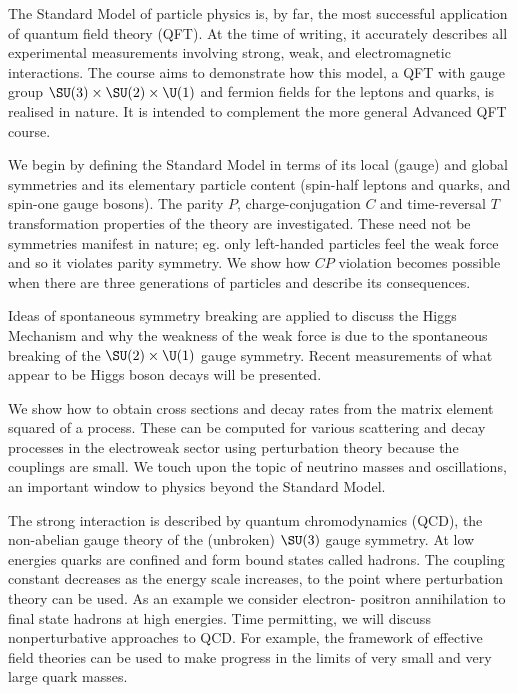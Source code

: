 \documentclass[a4paper]{article}
\begin{document}
\maketitle
{\small
\setlength{\parindent}{0em}
\setlength{\parskip}{1em}
The Standard Model of particle physics is, by far, the most successful application of quantum field theory (QFT). At the time of writing, it accurately describes all experimental measurements involving strong, weak, and electromagnetic interactions. The course aims to demonstrate how this model, a QFT with gauge group $\SU(3) \times \SU(2) \times \U(1)$ and fermion fields for the leptons and quarks, is realised in nature. It is intended to complement the more general Advanced QFT course.

We begin by defining the Standard Model in terms of its local (gauge) and global symmetries and its elementary particle content (spin-half leptons and quarks, and spin-one gauge bosons). The parity $P$, charge-conjugation $C$ and time-reversal $T$ transformation properties of the theory are investigated. These need not be symmetries manifest in nature; eg. only left-handed particles feel the weak force and so it violates parity symmetry. We show how $CP$ violation becomes possible when there are three generations of particles and describe its consequences.

Ideas of spontaneous symmetry breaking are applied to discuss the Higgs Mechanism and why the weakness of the weak force is due to the spontaneous breaking of the $\SU(2) \times \U(1)$ gauge symmetry. Recent measurements of what appear to be Higgs boson decays will be presented.

We show how to obtain cross sections and decay rates from the matrix element squared of a process. These can be computed for various scattering and decay processes in the electroweak sector using perturbation theory because the couplings are small. We touch upon the topic of neutrino masses and oscillations, an important window to physics beyond the Standard Model.

The strong interaction is described by quantum chromodynamics (QCD), the non-abelian gauge theory of the (unbroken) $\SU(3)$ gauge symmetry. At low energies quarks are confined and form bound states called hadrons. The coupling constant decreases as the energy scale increases, to the point where perturbation theory can be used. As an example we consider electron- positron annihilation to final state hadrons at high energies. Time permitting, we will discuss nonperturbative approaches to QCD. For example, the framework of effective field theories can be used to make progress in the limits of very small and very large quark masses.

}
\end{document}
